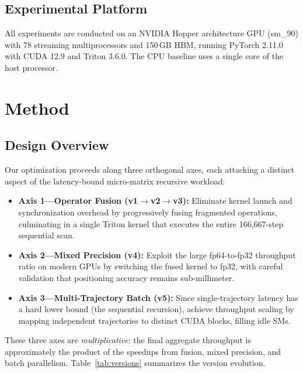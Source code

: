 \documentclass[pdflatex,sn-mathphys-num]{sn-jnl}%
\theoremstyle{thmstyleone}%
\theoremstyle{thmstyletwo}%
\theoremstyle{thmstylethree}%
\begin{document}
\subsection{Experimental Platform}\label{subsec:platform}

All experiments are conducted on an NVIDIA Hopper architecture GPU (sm\_90) with 78 streaming multiprocessors and 150\,GB HBM, running PyTorch 2.11.0 with CUDA 12.9 and Triton 3.6.0. The CPU baseline uses a single core of the host processor.

\section{Method}\label{sec3}

\subsection{Design Overview}\label{subsec:overview}

Our optimization proceeds along three orthogonal axes, each attacking a distinct aspect of the latency-bound micro-matrix recursive workload:

\begin{itemize}
\item \textbf{Axis 1---Operator Fusion (v1$\rightarrow$v2$\rightarrow$v3):} Eliminate kernel launch and synchronization overhead by progressively fusing fragmented operations, culminating in a single Triton kernel that executes the entire 166,667-step sequential scan.

\item \textbf{Axis 2---Mixed Precision (v4):} Exploit the large fp64-to-fp32 throughput ratio on modern GPUs by switching the fused kernel to fp32, with careful validation that positioning accuracy remains sub-millimeter.

\item \textbf{Axis 3---Multi-Trajectory Batch (v5):} Since single-trajectory latency has a hard lower bound (the sequential recursion), achieve throughput scaling by mapping independent trajectories to distinct CUDA blocks, filling idle SMs.
\end{itemize}

These three axes are \textit{multiplicative}: the final aggregate throughput is approximately the product of the speedups from fusion, mixed precision, and batch parallelism. Table~\ref{tab:versions} summarizes the version evolution.
\end{document}
